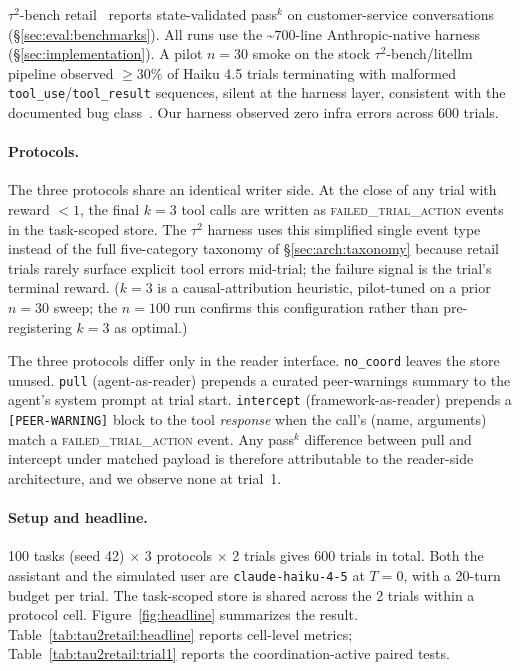 $\tau^2$-bench retail~\cite{tau2bench2025} reports state-validated
pass$^k$ on customer-service conversations
(\S\ref{sec:eval:benchmarks}). All runs use the
\textasciitilde$700$-line Anthropic-native harness
(\S\ref{sec:implementation}). A pilot $n{=}30$ smoke on the stock
$\tau^2$-bench/litellm pipeline observed $\geq30\%$ of Haiku 4.5
trials terminating with malformed
\texttt{tool\_use}/\texttt{tool\_result} sequences, silent at the
harness layer, consistent with the documented bug
class~\cite{litellmissue12404,litellmissue15322}. Our harness
observed zero infra errors across $600$ trials.

\paragraph{Protocols.}
The three protocols share an identical writer side.  At the close
of any trial with reward $<\!1$, the final $k{=}3$ tool calls
are written as \textsc{failed\_trial\_action} events in the
task-scoped store.  The $\tau^2$ harness uses this simplified
single event type instead of the full five-category taxonomy
of \S\ref{sec:arch:taxonomy} because retail trials
rarely surface explicit tool errors mid-trial; the failure signal
is the trial's terminal reward.  ($k{=}3$ is a causal-attribution
heuristic, pilot-tuned on a prior $n{=}30$ sweep; the $n{=}100$
run confirms this configuration rather than pre-registering
$k{=}3$ as optimal.)

The three protocols differ only in the reader interface.
\texttt{no\_coord} leaves the store unused. \texttt{pull}
(agent-as-reader) prepends a curated peer-warnings summary to the
agent's system prompt at trial start. \texttt{intercept}
(framework-as-reader) prepends a \texttt{[PEER-WARNING]} block to
the tool \emph{response} when the call's (name, arguments) match
a \textsc{failed\_trial\_action} event. Any pass$^k$ difference
between pull and intercept under matched payload is therefore
attributable to the reader-side architecture, and we observe none
at trial~1.

\paragraph{Setup and headline.}
100 tasks (seed 42) $\times$ 3 protocols $\times$ 2 trials gives
600 trials in total.  Both the assistant and the simulated user
are \texttt{claude-haiku-4-5} at $T{=}0$, with a 20-turn budget
per trial.  The task-scoped store is shared across the 2 trials
within a protocol cell.  Figure~\ref{fig:headline} summarizes the
result.  Table~\ref{tab:tau2retail:headline} reports cell-level
metrics; Table~\ref{tab:tau2retail:trial1} reports the
coordination-active paired tests.

